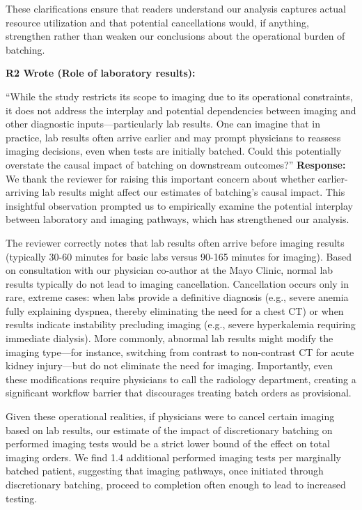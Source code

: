 \documentclass[11pt]{article}
\newenvironment{quote2}
{ \bigskip
\noindent
         \small\em
         \baselineskip=14pt
}
\newcommand{\1}{\hbox{\rm 1\kern-.35em 1}}
\begin{document}
{{These clarifications ensure that readers understand our analysis captures actual resource utilization and that potential cancellations would, if anything, strengthen rather than weaken our conclusions about the operational burden of batching.

\color{black}

\begin{quote2}
\textbf{R2 Wrote (Role of laboratory results):}  

\noindent``While the study restricts its scope to imaging due to
its operational constraints, it does not address the interplay and potential dependencies
between imaging and other diagnostic inputs—particularly lab results. One can imagine
that in practice, lab results often arrive earlier and may prompt physicians to reassess
imaging decisions, even when tests are initially batched. Could this potentially overstate
the causal impact of batching on downstream outcomes?” 
\end{quote2}

\noindent\textbf{Response:} \color{blue}
We thank the reviewer for raising this important concern about whether earlier-arriving lab results might affect our estimates of batching's causal impact. This insightful observation prompted us to empirically examine the potential interplay between laboratory and imaging pathways, which has strengthened our analysis.

The reviewer correctly notes that lab results often arrive before imaging results (typically 30-60 minutes for basic labs versus 90-165 minutes for imaging). Based on consultation with our physician co-author at the Mayo Clinic, normal lab results typically do not lead to imaging cancellation. Cancellation occurs only in rare, extreme cases: when labs provide a definitive diagnosis (e.g., severe anemia fully explaining dyspnea, thereby eliminating the need for a chest CT) or when results indicate instability precluding imaging (e.g., severe hyperkalemia requiring immediate dialysis). More commonly, abnormal lab results might modify the imaging type—for instance, switching from contrast to non-contrast CT for acute kidney injury—but do not eliminate the need for imaging. Importantly, even these modifications require physicians to call the radiology department, creating a significant workflow barrier that discourages treating batch orders as provisional.

Given these operational realities, if physicians were to cancel certain imaging based on lab results, our estimate of the impact of discretionary batching on performed imaging tests would be a strict lower bound of the effect on total imaging orders. We find 1.4 additional performed imaging tests per marginally batched patient, suggesting that imaging pathways, once initiated through discretionary batching, proceed to completion often enough to lead to increased testing. 

}}
\end{document}
